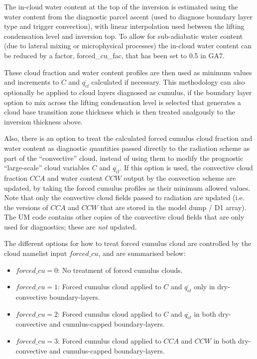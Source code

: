 \documentclass{UMDP_article}
\begin{document}
The in-cloud water content at the top of the inversion is estimated using the water content 
from the diagnostic parcel ascent (used to diagnose boundary layer type and trigger convection), 
with linear interpolation used between the lifting condensation level and inversion 
top.  To allow for sub-adiabatic water content (due to lateral mixing or microphysical 
processes) the in-cloud water content can be reduced by a factor, forced\_cu\_fac, that has been 
set to 0.5 in GA7.

These cloud fraction and water content profiles are then used as minimum values and 
increments to $C$ and $\overline{q_{cl}}$  calculated if necessary. 
This methodology can also optionally be applied to cloud layers diagnosed as cumulus, if the 
boundary layer option to mix across the lifting condensation level is selected that generates 
a cloud base transition zone thickness which is then treated analgously to the inversion 
thickness above.

Also, there is an option to treat the calculated forced cumulus cloud
fraction and water content as diagnostic quantities passed directly to
the radiation scheme as part of the ``convective'' cloud, instead of
using them to modify the prognostic ``large-scale'' cloud variables
$C$ and $\overline{q_{cl}}$.  If this option is used, the convective
cloud fraction $CCA$ and water content $CCW$ output by the convection
scheme are updated, by taking the forced cumulus profiles as their
minimum allowed values.  Note that only the convective cloud fields
passed to radiation are updated (i.e. the versions of $CCA$ and $CCW$
that are stored in the model dump / D1 array).  The UM code contains
other copies of the convective cloud fields that are only used for
diagnostics; these are {\em not} updated.

The different options for how to treat forced cumulus cloud are
controlled by the cloud namelist input $forced\_cu$, and are
summarised below:

\begin{itemize}
\item $forced\_cu = 0$: No treatment of forced cumulus clouds.
\item $forced\_cu = 1$: Forced cumulus cloud applied to
$C$ and $\overline{q_{cl}}$ only in dry-convective boundary-layers.
\item $forced\_cu = 2$: Forced cumulus cloud applied to
$C$ and $\overline{q_{cl}}$ in both dry-convective and
cumulus-capped boundary-layers.
\item $forced\_cu = 3$: Forced cumulus cloud applied to
$CCA$ and $CCW$ in both dry-convective and
cumulus-capped boundary-layers.
\end{itemize}
\end{document}
